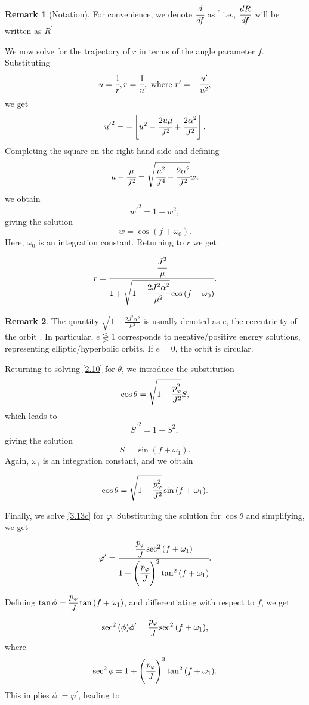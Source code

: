 \documentclass[12pt,oneside]{report}
\theoremstyle{definition}
\newtheorem{remark}{Remark}
\begin{document}
\begin{remark}[Notation]
For convenience, we denote $\cfrac{d}{df}$ as $^{\prime}$ i.e., $\displaystyle\frac{d R}{d f}$ will be written as $R^{\prime}$
\end{remark}
We now solve for the trajectory of $r$ in terms of the angle parameter $f$. Substituting 
$$ u = \cfrac{1}{r}, r = \cfrac{1}{u}, \ \text{where} \ r^{\prime} = -\cfrac{u^{\prime}}{u^{2}},$$ 
we get
$$ {u^{\prime}}^{2} = -\left[ u^{2} - \cfrac{2 u\mu }{J^{2}} + \cfrac{2\alpha^{2}}{J^{2}}\right]. $$
Completing the square on the right-hand side and defining
$$ u - \cfrac{\mu}{J^{2}}= \sqrt{\cfrac{\mu^{2}}{J^{4}} - \cfrac{2\alpha^{2}}{J^{2}}} w, $$
we obtain
$$ {w^{\prime}}^{2} = 1 - w^{2}, $$
giving the solution
$$ w = \cos{(f+\omega_{0})}. $$
Here, $\omega_{0}$ is an integration constant. Returning to $r$ we get

\begin{equation} \label{2.12}
    r = \cfrac{\cfrac{J^{2}}{\mu}}{1 + \sqrt{1-\cfrac{2J^{2}\alpha^{2}}{\mu^{2}}} \cos{(f+\omega_{0})}}.
\end{equation}

\begin{remark}
The quantity $ \sqrt{1-\frac{2J^{2}\alpha^{2}}{\mu^{2}}}  $ is usually denoted as $e$, the eccentricity of the orbit \cite{o2008integrable}. In particular, $e \lesseqgtr 1$ corresponds to negative/positive energy solutions, representing elliptic/hyperbolic orbits. If $e = 0$, the orbit is circular.
\end{remark}
Returning to solving \autoref{2.10} for $\theta$, we introduce the substitution
$$ \cos{\theta} = \sqrt{1- \cfrac{p_{\varphi}^{2}}{J^{2}}} S, $$
which leads to
$$ {S^{\prime}}^{2} = 1 - S^{2}, $$
giving the solution
$$ S = \sin{(f+\omega_{1})}. $$
Again, $\omega_{1}$ is an integration constant, and we obtain

\begin{equation}
    \cos{\theta}=\sqrt{1- \cfrac{p_{\varphi}^{2}}{J^{2}}} \sin{(f+\omega_{1})}.
\end{equation}

Finally, we solve \autoref{3.13c} for $\varphi$. Substituting the solution for $\cos{\theta}$ and simplifying, we get
$$  \varphi^{\prime} = \cfrac{\cfrac{p_{\varphi}}{J} \sec^{2}{(f+\omega_{1})}}{1 + \left(  \cfrac{p_{\varphi}}{J} \right)^{2} \tan^{2}{(f+\omega_{1})}}. $$
Defining $\tan{\phi} = \cfrac{p_{\varphi}}{J}\tan{(f+\omega_{1})}$, and differentiating with respect to $f$, we get
$$ \sec^{2}{(\phi)} \phi^{\prime} = \cfrac{p_{\varphi}}{J} \sec^{2}{(f+\omega_1)}, $$
where
$$ \sec^{2}{\phi} = 1+\left( \cfrac{p_{\varphi}}{J} \right)^{2}\tan^{2}{(f+\omega_1)}. $$
This implies $\phi^{\prime} = \varphi^{\prime}$, leading to
\end{document}
